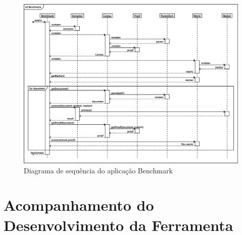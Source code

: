 \documentclass[12pt, a4paper]{article}
\begin{document}
\begin{figure}[htb!]
  \begin{center}
  \includegraphics[width=15cm]{img/fastbenchmark.eps}
  \caption{Diagrama de sequência do aplicação Benchmark}
  \label{sequencia}
  \end{center}
\end{figure}

\section{Acompanhamento do Desenvolvimento da Ferramenta}
\end{document}
